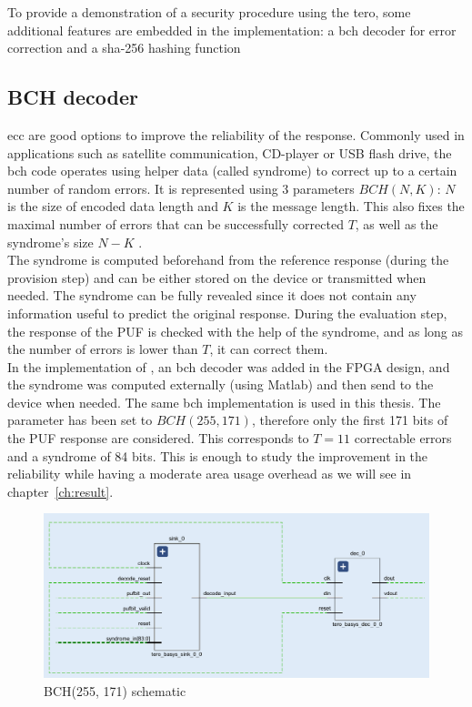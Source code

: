 To provide a demonstration of a security procedure using the \acrshort{tero}, some additional features are embedded in the implementation: a \acrfull{bch} decoder for error correction and a \acrshort{sha}-256 hashing function\\

\subsection{BCH decoder}
\label{subsec:demon_feature_bch}

\acrshort{ecc} are good options to improve the reliability of the response. Commonly used in applications such as satellite communication, CD-player or USB flash drive, the \acrshort{bch} code operates using helper data (called syndrome) to correct up to a certain number of random errors. It is represented using 3 parameters $BCH(N, K)$: $N$ is the size of encoded data length and $K$ is the message length. This also fixes the maximal number of errors that can be successfully corrected $T$, as well as the syndrome's size $N - K$ \cite{freudenberger_reduced_2021}.\\

The syndrome is computed beforehand from the reference response (during the provision step) and can be either stored on the device or transmitted when needed. The syndrome can be fully revealed since it does not contain any information useful to predict the original response. During the evaluation step, the response of the PUF is checked with the help of the syndrome, and as long as the number of errors is lower than $T$, it can correct them.\\

In the implementation of \cite{de_weerdt_implementation_2021}, an \acrshort{bch} decoder was added in the FPGA design, and the syndrome was computed externally (using Matlab) and then send to the device when needed. The same \acrshort{bch} implementation is used in this thesis. The parameter has been set to $BCH(255, 171)$, therefore only the first 171 bits of the PUF response are considered. This corresponds to $T=11$ correctable errors and a syndrome of 84 bits. This is enough to study the improvement in the reliability while having a moderate area usage overhead as we will see in chapter~\ref{ch:result}.\\

\begin{figure}[H]
    \centering \includegraphics[width=\linewidth]{images/bch_schematic.png}
    \caption{BCH(255, 171) schematic}
    \label{fig:bch_schematic}
\end{figure}


